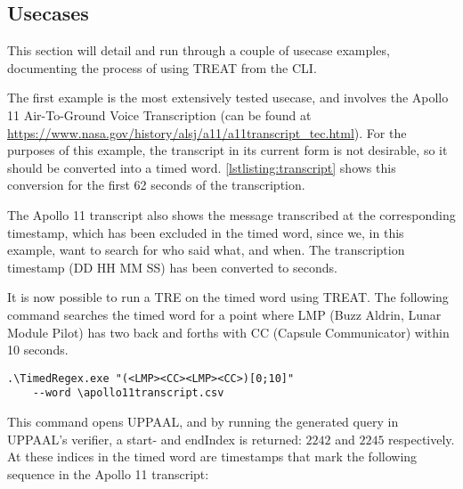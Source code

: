 \subsection{Usecases}\label{subsec:usecases}


This section will detail and run through a couple of usecase examples, documenting the process of using TREAT from the CLI.

The first example is the most extensively tested usecase, and involves the Apollo 11 Air-To-Ground Voice Transcription (can be found at \url{https://www.nasa.gov/history/alsj/a11/a11transcript_tec.html}). For the purposes of this example, the transcript in its current form is not desirable, so it should be converted into a timed word. \cref{lstlisting:transcript} shows this conversion for the first 62 seconds of the transcription.



The Apollo 11 transcript also shows the message transcribed at the corresponding timestamp, which has been excluded in the timed word, since we, in this example, want to search for who said what, and when. The transcription timestamp (DD HH MM SS) has been converted to seconds.

It is now possible to run a TRE on the timed word using TREAT. The following command searches the timed word for a point where LMP (Buzz Aldrin, Lunar Module Pilot) has two back and forths with CC (Capsule Communicator) within 10 seconds.

\begin{minipage}{\columnwidth}
    \begin{lstlisting}[basicstyle=\scriptsize\ttfamily]
    .\TimedRegex.exe "(<LMP><CC><LMP><CC>)[0;10]"
    --word \apollo11transcript.csv
            \end{lstlisting}
\end{minipage}
\vspace{-1em}
\label{lstlisting:lmpcctre}
\vspace{1em}

This command opens UPPAAL, and by running the generated query in UPPAAL's verifier, a start- and endIndex is returned: $2242$ and $2245$ respectively. At these indices in the timed word are timestamps that mark the following sequence in the Apollo 11 transcript:

